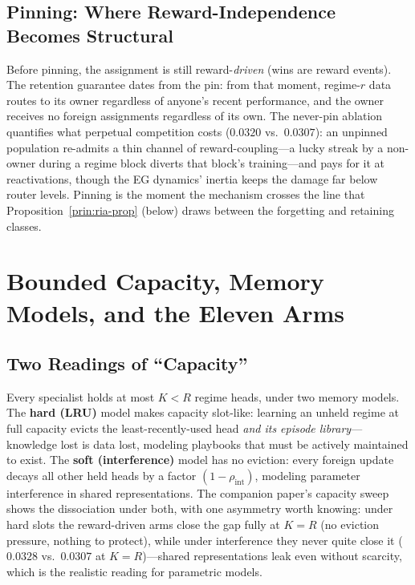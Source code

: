 \documentclass[10pt]{article}
\begin{document}
\subsection{Pinning: Where Reward-Independence Becomes Structural}

Before pinning, the assignment is still reward-\emph{driven} (wins are
reward events). The retention guarantee dates from the pin: from that
moment, regime-$r$ data routes to its owner regardless of anyone's
recent performance, and the owner receives no foreign assignments
regardless of its own. The never-pin ablation quantifies what perpetual
competition costs ($0.0320$ vs.\ $0.0307$): an unpinned population
re-admits a thin channel of reward-coupling---a lucky streak by a
non-owner during a regime block diverts that block's training---and pays
for it at reactivations, though the EG dynamics' inertia keeps the damage
far below router levels. Pinning is the moment the mechanism crosses the
line that Proposition~\ref{prin:ria-prop} (below) draws between the
forgetting and retaining classes.

\section{Bounded Capacity, Memory Models, and the Eleven Arms}
\label{sec:capacity}

\subsection{Two Readings of ``Capacity''}

Every specialist holds at most $K < R$ regime heads, under two memory
models. The \textbf{hard (LRU)} model makes capacity slot-like: learning
an unheld regime at full capacity evicts the least-recently-used head
\emph{and its episode library}---knowledge lost is data lost, modeling
playbooks that must be actively maintained to exist. The \textbf{soft
(interference)} model has no eviction: every foreign update decays all
other held heads by a factor $(1 - \rho_{\mathrm{int}})$, modeling
parameter interference in shared representations. The companion paper's
capacity sweep shows the dissociation under both, with one asymmetry
worth knowing: under hard slots the reward-driven arms close the gap
fully at $K = R$ (no eviction pressure, nothing to protect), while under
interference they never quite close it ($0.0328$ vs.\ $0.0307$ at
$K = R$)---shared representations leak even without scarcity, which is
the realistic reading for parametric models.
\end{document}
